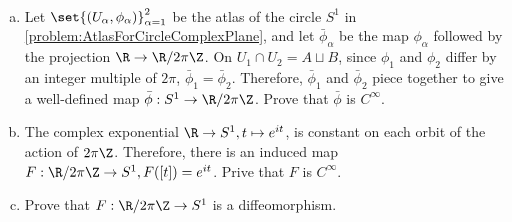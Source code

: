 \begin{problem}
	$ \ $
	\label{problem:quotientOfRByZIsCircle}
	\begin{enumerate}[(a)]
		\item Let $ \set{(U_\alpha,\phi_\alpha)}_{\alpha=1}^{2} $ be the atlas of the circle $ S^1 $ in \autoref{problem:AtlasForCircleComplexPlane}, and let $ \bar{\phi}_\alpha $ be the map $ \phi_\alpha $ followed by the projection $ \R \to \R/2\pi\Z $. On $ U_1\cap U_2  = A \sqcup B$, since $ \phi_1 $ and $ \phi_2 $ differ by an integer multiple of $ 2\pi $, $ \bar{\phi}_1 = \bar{\phi}_2 $. Therefore, $ \bar{\phi}_1 $ and $ \bar{\phi}_2 $ piece together to give a well-defined map $ \bar{\phi}:S^1 \to \R/2\pi\Z $. Prove that $ \bar{\phi} $ is $ C^\infty $.
		\item The complex exponential $ \R\to S^1, t\mapsto e^{it} $, is constant on each orbit of the action of $ 2\pi\Z $. Therefore, there is an induced map $ F:\R/2\pi\Z \to S^1, F([t]) = e^{it} $. Prive that $ F $ is $ C^\infty $.
		
		\item Prove that $ F: \R/2\pi\Z \to S^1 $ is a diffeomorphism.
	\end{enumerate}
\end{problem}
